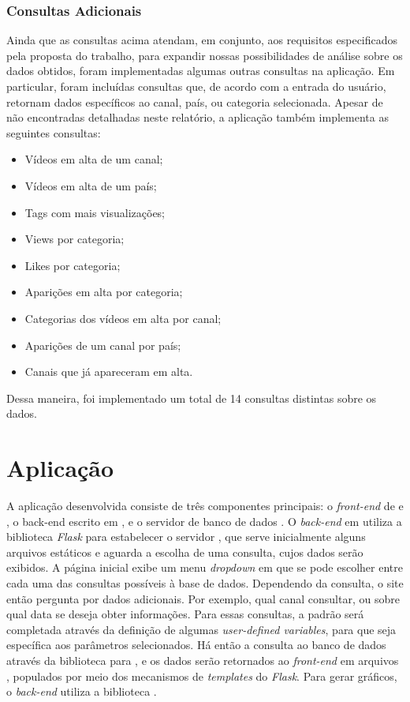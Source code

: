 \subsection{Consultas Adicionais}

  Ainda que as consultas acima atendam, em conjunto, aos requisitos especificados pela proposta do trabalho, para expandir nossas
  possibilidades de análise sobre os dados obtidos, foram implementadas algumas outras consultas na aplicação. Em particular,
  foram incluídas consultas que, de acordo com a entrada do usuário, retornam dados específicos ao canal, país, ou categoria
  selecionada. Apesar de não encontradas detalhadas neste relatório, a aplicação  também implementa as seguintes consultas:
  \begin{itemize}
    \item Vídeos em alta de um canal;
    \item Vídeos em alta de um país;
    \item Tags com mais visualizações;
    \item Views por categoria;
    \item Likes por categoria;
    \item Aparições em alta por categoria;
    \item Categorias dos vídeos em alta por canal;
    \item Aparições de um canal por país;
    \item Canais que já apareceram em alta.
  \end{itemize}

  Dessa maneira, foi implementado um total de 14 consultas distintas sobre os dados.

\chapter{Aplicação}

  A aplicação desenvolvida consiste de três componentes principais: o \emph{front-end} de  e ,
  o back-end escrito em , e o servidor de banco de dados . O \emph{back-end} em 
  utiliza a biblioteca
  \emph{Flask} para estabelecer o servidor , que serve inicialmente alguns arquivos estáticos e aguarda a escolha de uma
  consulta, cujos dados serão exibidos. A página inicial exibe um menu \emph{dropdown} em que se pode escolher entre cada
  uma das consultas possíveis à base de dados. Dependendo da consulta, o site então pergunta por dados adicionais. Por exemplo,
  qual canal consultar, ou sobre qual data se deseja obter informações. Para essas consultas, a  padrão será
  completada através da definição de algumas \emph{user-defined variables}, para que seja específica aos parâmetros
  selecionados. Há então a consulta ao banco de dados através da biblioteca  para , e os dados
  serão retornados ao \emph{front-end} em arquivos , populados por meio dos mecanismos de \emph{templates} do \emph{Flask}.
  Para gerar gráficos, o \emph{back-end} utiliza a biblioteca .

